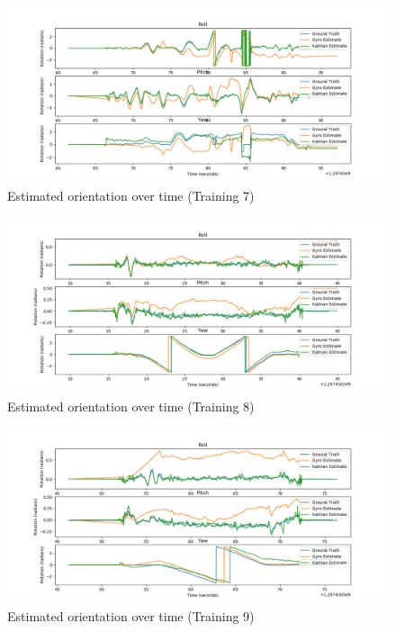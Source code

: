 \documentclass[a4paper]{article}
\begin{document}
\begin{figure}[h]
  \centering
    \includegraphics[width=1\textwidth]{rpy_trainset7.png}
  \caption{Estimated orientation over time (Training 7)\label{fig:rpy_trainset7}}
\end{figure}

\begin{figure}[h]
  \centering
    \includegraphics[width=1\textwidth]{rpy_trainset8.png}
  \caption{Estimated orientation over time (Training 8)\label{fig:rpy_trainset8}}
\end{figure}

\begin{figure}[h]
  \centering
    \includegraphics[width=1\textwidth]{rpy_trainset9.png}
  \caption{Estimated orientation over time (Training 9)\label{fig:rpy_trainset9}}
\end{figure}
\end{document}
